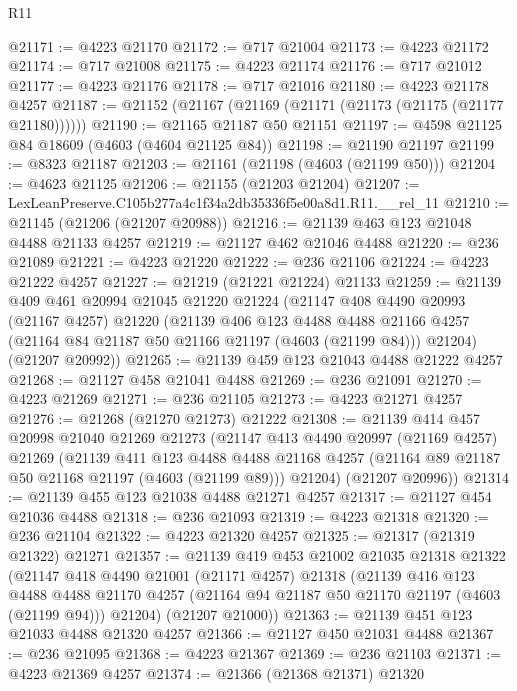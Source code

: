 \begin{lexlean}{R11}
\begin{coremodule}
@21171 := @4223 @21170
@21172 := @717 @21004
@21173 := @4223 @21172
@21174 := @717 @21008
@21175 := @4223 @21174
@21176 := @717 @21012
@21177 := @4223 @21176
@21178 := @717 @21016
@21180 := @4223 @21178 @4257
@21187 := @21152 (@21167 (@21169 (@21171 (@21173 (@21175 (@21177 @21180))))))
@21190 := @21165 @21187 @50 @21151
@21197 := @4598 @21125 @84 @18609 (@4603 (@4604 @21125 @84))
@21198 := @21190 @21197
@21199 := @8323 @21187
@21203 := @21161 (@21198 (@4603 (@21199 @50)))
@21204 := @4623 @21125
@21206 := @21155 (@21203 @21204)
@21207 := LexLeanPreserve.C105b277a4c1f34a2db35336f5e00a8d1.R11.__rel_11
@21210 := @21145 (@21206 (@21207 @20988))
@21216 := @21139 @463 @123 @21048 @4488 @21133 @4257
@21219 := @21127 @462 @21046 @4488
@21220 := @236 @21089
@21221 := @4223 @21220
@21222 := @236 @21106
@21224 := @4223 @21222 @4257
@21227 := @21219 (@21221 @21224) @21133
@21259 := @21139
    @409
    @461
    @20994
    @21045
    @21220
    @21224
    (@21147
      @408
      @4490
      @20993
      (@21167 @4257)
      @21220
      (@21139
        @406
        @123
        @4488
        @4488
        @21166
        @4257
        (@21164 @84 @21187 @50 @21166 @21197 (@4603 (@21199 @84)))
        @21204)
      (@21207 @20992))
@21265 := @21139 @459 @123 @21043 @4488 @21222 @4257
@21268 := @21127 @458 @21041 @4488
@21269 := @236 @21091
@21270 := @4223 @21269
@21271 := @236 @21105
@21273 := @4223 @21271 @4257
@21276 := @21268 (@21270 @21273) @21222
@21308 := @21139
    @414
    @457
    @20998
    @21040
    @21269
    @21273
    (@21147
      @413
      @4490
      @20997
      (@21169 @4257)
      @21269
      (@21139
        @411
        @123
        @4488
        @4488
        @21168
        @4257
        (@21164 @89 @21187 @50 @21168 @21197 (@4603 (@21199 @89)))
        @21204)
      (@21207 @20996))
@21314 := @21139 @455 @123 @21038 @4488 @21271 @4257
@21317 := @21127 @454 @21036 @4488
@21318 := @236 @21093
@21319 := @4223 @21318
@21320 := @236 @21104
@21322 := @4223 @21320 @4257
@21325 := @21317 (@21319 @21322) @21271
@21357 := @21139
    @419
    @453
    @21002
    @21035
    @21318
    @21322
    (@21147
      @418
      @4490
      @21001
      (@21171 @4257)
      @21318
      (@21139
        @416
        @123
        @4488
        @4488
        @21170
        @4257
        (@21164 @94 @21187 @50 @21170 @21197 (@4603 (@21199 @94)))
        @21204)
      (@21207 @21000))
@21363 := @21139 @451 @123 @21033 @4488 @21320 @4257
@21366 := @21127 @450 @21031 @4488
@21367 := @236 @21095
@21368 := @4223 @21367
@21369 := @236 @21103
@21371 := @4223 @21369 @4257
@21374 := @21366 (@21368 @21371) @21320

\end{coremodule}
\end{lexlean}
